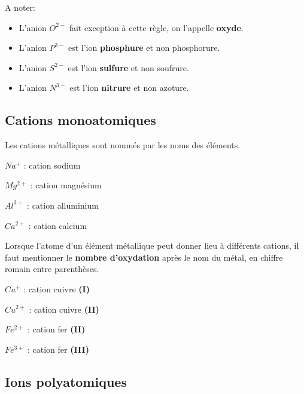 \documentclass[
  11pt,
  french,
  a4paper,
  openany]{book}
\providecommand{\tightlist}{%
  \setlength{\itemsep}{0pt}\setlength{\parskip}{0pt}}
\begin{document}
A noter:

\begin{itemize}
\tightlist
\item
  L'anion \(O^{2-}\) fait exception à cette règle, on l'appelle \textbf{oxyde}.
\item
  L'anion \(P^{3-}\) est l'ion \textbf{phosphure} et non phosphorure.
\item
  L'anion \(S^{2-}\) est l'ion \textbf{sulfure} et non soufrure.
\item
  L'anion \(N^{3-}\) est l'ion \textbf{nitrure} et non azoture.
\end{itemize}

\newpage

\hypertarget{cations-monoatomiques}{%
\subsection{Cations monoatomiques}\label{cations-monoatomiques}}

Les cations métalliques sont nommés par les noms des éléments.

\begin{multicols}{3}
\(Na^+\) : cation sodium

\(Mg^{2+}\) : cation magnésium

\(Al^{3+}\) : cation alluminium

\(Ca^{2+}\) : cation calcium

\end{multicols}

Lorsque l'atome d'un élément métallique peut donner lieu à différents cations, il faut mentionner le \textbf{nombre d'oxydation} après le nom du métal, en chiffre romain entre parenthèses.

\begin{multicols}{3}
\(Cu^+\) : cation cuivre \textbf{(I)}

\(Cu^{2+}\) : cation cuivre \textbf{(II)}

\(Fe^{2+}\) : cation fer \textbf{(II)}

\(Fe^{3+}\) : cation fer \textbf{(III)}

\end{multicols}

\hypertarget{ions-polyatomiques}{%
\subsection{Ions polyatomiques}\label{ions-polyatomiques}}
\end{document}
